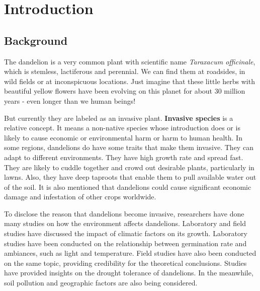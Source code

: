 \documentclass[12pt]{article}
\begin{document}
\maketitle
\tableofcontents

\section{Introduction}

	\subsection{Background}
	
	The dandelion is a very common plant with scientific name \textit{Taraxacum officinale}, which is stemless, lactiferous and perennial\autocite{stewart2002biology}.  We can find them at roadsides, in wild fields or at inconspicuous locations.  Just imagine that these little herbs with beautiful yellow flowers have been evolving on this planet for about 30 million years\autocite{dandelionhistory} - even longer than we human beings!
	
	But currently they are labeled as an invasive plant.  \textbf{Invasive species} is a relative concept.  It means a non-native species whose introduction does or is likely to cause economic or environmental harm or harm to human health\autocite{defInvasive}.  In some regions, dandelions do have some traits that make them invasive.  They can adapt to different environments.  They have high growth rate and spread fast. They are likely to cuddle together and crowd out desirable plants, particularly in lawns.  Also, they have deep taproots that enable them to pull available water out of the soil.  It is also mentioned that dandelions could cause significant economic damage and infestation of other crops worldwide\autocite{stewart2002biology}.
	
	To disclose the reason that dandelions become invasive, researchers have done many studies on how the environment affects dandelions.  Laboratory and field studies have discussed the impact of climatic factors on its growth. Laboratory studies have been conducted on the relationship between germination rate and ambiances, such as light and temperature\autocite{letchamo1996light}.  Field studies have also been conducted on the same topic, providing credibility for the theoretical conclusions\autocite{yoneda1991effects}.  Studies have provided insights on the drought tolerance of dandelions\autocite{brock2005drought}. In the meanwhile, soil pollution and geographic factors are also being considered\autocite{verhoeven2013geographic}.
	
\end{document}

